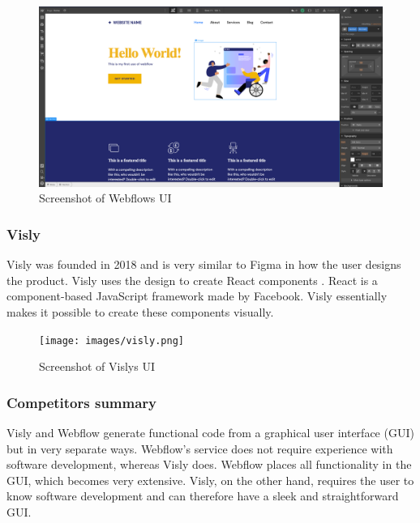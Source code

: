 \begin{figure}[H]
  \centering
  \includegraphics[width=0.8\linewidth]{images/webflow.png}
  \caption{Screenshot of Webflows UI}%
  \label{fig:webflow}
\end{figure}

\subsubsection{Visly}%
\label{ssub:Visly}
Visly was founded in 2018 and is very similar to Figma in how the user designs the product. Visly uses the design to create React components \cite{facebookincReactJavaScriptLibrary}. React is a component-based JavaScript framework made by Facebook. Visly essentially makes it possible to create these components visually. 

\begin{figure}[H]
  \centering
  \texttt{[image: images/visly.png]}
  \caption{ Screenshot of Vislys UI }%
  \label{fig:visly}
\end{figure}







\subsubsection{Competitors summary}%
\label{ssub:Comparison}
Visly and Webflow generate functional code from a graphical user interface (GUI) but in very separate ways. Webflow's service does not require experience with software development, whereas Visly does. Webflow places all functionality in the GUI, which becomes very extensive. Visly, on the other hand, requires the user to know software development and can therefore have a sleek and straightforward GUI.

